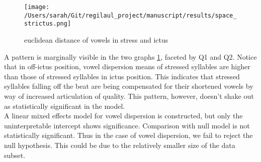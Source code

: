 \begin{figure}[htbp]
\centering
\texttt{[image: /Users/sarah/Git/regilaul\_project/manuscript/results/space\_strictus.png]}
\caption{euclidean distance of vowels in stress and ictus}
\label{spcstrick}

\end{figure}
A pattern is marginally visible in the two graphs  \ref{spcstrick}, faceted by Q1 and Q2. Notice that in off-ictus position, vowel dispersion means of stressed syllables are higher than those of stressed syllables in ictus position. This indicates that stressed syllables falling off the beat are being compensated for their shortened vowels by way of increased articulation of quality. This pattern, however, doesn't shake out as statistically significant in the model. \\
A linear mixed effects model for vowel dispersion is constructed, but only the uninterpretable intercept shows significance. 
Comparison with null model is not statistically significant. Thus in the case of vowel dispersion, we fail to reject the null hypothesis. This could be due to the relatively smaller size of the data subset. 


